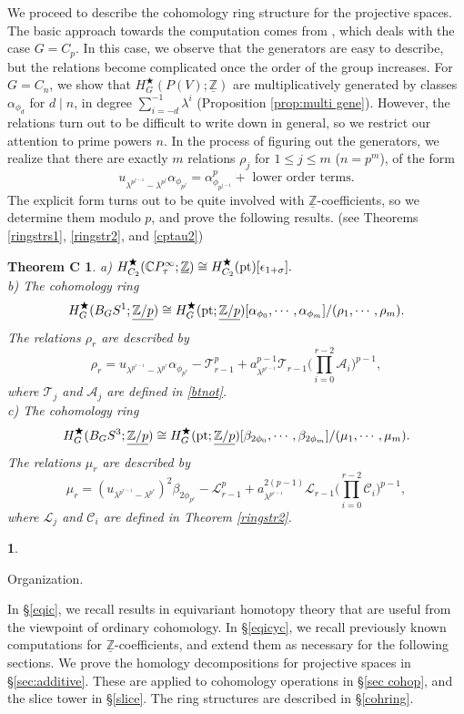 \documentclass[a4paper,leqno,11pt]{amsart}
\theoremstyle{plain}
\newtheorem*{thmc}{Theorem C}
\theoremstyle{definition}
\newtheorem{subsec}[theorem]{}
\theoremstyle{remark}
\theoremstyle{definition}
\newcommand{\C}{{\mathbb C}}
\newcommand{\Z}{{\mathbb{Z}}}
\newcommand{\uZp}{\underline{\Z/p}}
\newcommand\CC{{\mathcal C}}
\newcommand\LL{{\mathcal L}}
\newcommand\TT{{\mathcal T}}
\newenvironment{mysubsection}[2][]
{\begin{subsec}\begin{upshape}\begin{bfseries}{#2.}
			\end{bfseries}{#1}}
		{\end{upshape}\end{subsec}}
\newcommand{\cA}{\mathcal A}
\newcommand{\uZ}{\underline{\mathbb{Z}}}
\def\Z{\mathbb{Z}}
\def\a{\alpha}
\def\lam{\lambda}
\def\C{\mathbb{C}}
\numberwithin{equation}{section}
\newcommand{\pt}{\textup{pt}}
\begin{document}
We proceed to describe the cohomology ring structure for the projective spaces. The basic approach towards the computation comes from \cite{Lewis}, which deals with the case $G=C_p$. In this case, we observe that the generators are easy to describe, but the relations become complicated once the order of the group increases. For $G=C_n$, we show that $H^\bigstar_G(P(V);\uZ)$ are multiplicatively generated by classes $\alpha_{\phi_d}$ for $d\mid n$, in degree $\sum_{i=-d}^{-1} \lam^i$ (Proposition \ref{prop:multi gene}). However, the relations turn out to be difficult to write down in general, so we restrict our attention to prime powers $n$. In the process of figuring out the generators, we realize that there are exactly $m$ relations $\rho_j$ for $1\leq j\leq m$ ($n=p^m$), of the form 
\[u_{\lam^{p^{j-1}}-\lam^{p^j}}\alpha_{\phi_{p^j}} = \alpha_{\phi_{p^{j-1}}}^p + \mbox{ lower order terms}.\]
The explicit form turns out to be quite involved with $\uZ$-coefficients, so we determine them modulo $p$, and prove the following results. (see Theorems \ref{ringstrs1}, \ref{ringstr2}, and  \ref{cptau2}) 
\begin{thmc} 
a) 	$H^\bigstar_{C_2}(\C P^\infty_\tau;\uZ)\cong H^\bigstar_{C_2}(\pt)[\epsilon_{1+\sigma}].$\\
b) The cohomology ring 
	\[ H^\bigstar_G (B_GS^1;\uZp) \cong H^\bigstar_G(\pt;\uZp)[\a_{\phi_0},\cdots,\a_{\phi_m}]/(\rho_1,\cdots, \rho_m).\]
	The relations $\rho_r$ are described by 
	\[\rho_r= u_{\lam^{p^{r-1}}-\lam^{p^{r}}}\a_{\phi_{p^{r}}}- \TT_{r-1}^p + a_{\lambda^{p^{r-1}}}^{p-1}\TT_{r-1}\big(\prod_{i=0}^{r-2} \cA_i\big)^{p-1}, \]
	where $\TT_j$ and $\cA_j$ are defined in \eqref{btnot}. \\
c) The cohomology ring 
\[ H^\bigstar_G (B_GS^3;\uZp) \cong H^\bigstar_G(\pt;\uZp)[\beta_{2\phi_0},\cdots,\beta_{2\phi_m}]/(\mu_1,\cdots, \mu_m).\]
	The relations $\mu_r$ are described by 
	\[\mu_r= (u_{\lam^{p^{r-1}}-\lam^{p^{r}}})^2\beta_{2\phi_{p^{r}}}- \LL_{r-1}^p + a_{\lambda^{p^{r-1}}}^{2(p-1)}\LL_{r-1}\big(\prod_{i=0}^{r-2} \CC_i\big)^{p-1}, \]
	where $\LL_j$ and $\CC_i$ are defined in Theorem \ref{ringstr2}. 
\end{thmc}
	
	\begin{mysubsection}{Organization}
In \S \ref{eqic}, we recall results in equivariant homotopy theory that are useful from the viewpoint of ordinary cohomology. In \S \ref{eqicyc}, we recall previously known computations for $\uZ$-coefficients, and extend them as necessary for the following sections. We prove the homology decompositions for projective spaces in \S \ref{sec:additive}. These are applied to cohomology operations in \S \ref{sec cohop}, and the slice tower in \S \ref{slice}. The ring structures are described in \S \ref{cohring}.
	\end{mysubsection}
	
\end{document}
